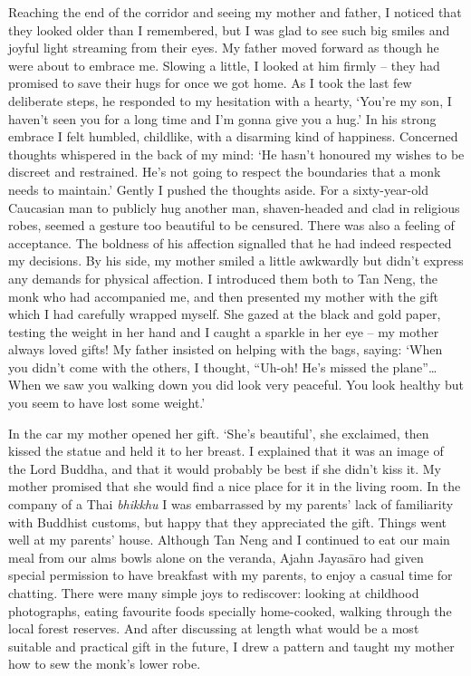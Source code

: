 Reaching the end of the corridor and seeing my mother and father, I
noticed that they looked older than I remembered, but I was glad to see
such big smiles and joyful light streaming from their eyes. My father
moved forward as though he were about to embrace me. Slowing a little, I
looked at him firmly -- they had promised to save their hugs for once
we got home. As I took the last few deliberate steps, he responded to my
hesitation with a hearty, `You're my son, I haven't seen you for a long
time and I'm gonna give you a hug.' In his strong embrace I felt
humbled, childlike, with a disarming kind of happiness. Concerned
thoughts whispered in the back of my mind: `He hasn't honoured my wishes
to be discreet and restrained. He's not going to respect the boundaries
that a monk needs to maintain.' Gently I pushed the thoughts aside. For
a sixty-year-old Caucasian man to publicly hug another man, 
shaven-headed and clad in religious robes, seemed a gesture too
beautiful to be censured. There was also a feeling of acceptance. The
boldness of his affection signalled that he had indeed respected my
decisions. By his side, my mother smiled a little awkwardly but didn't
express any demands for physical affection. I introduced them both to
Tan Neng, the monk who had accompanied me, and then presented my mother
with the gift which I had carefully wrapped myself. She gazed at the
black and gold paper, testing the weight in her hand and I caught a
sparkle in her eye -- my mother always loved gifts! My father insisted
on helping with the bags, saying: `When you didn't come with the others, 
I thought, ``Uh-oh! He's missed the plane''\ldots{} When we saw you
walking down you did look very peaceful. You look healthy but you seem
to have lost some weight.'

In the car my mother opened her gift. `She's beautiful', she exclaimed, 
then kissed the statue and held it to her breast. I explained that it
was an image of the Lord Buddha, and that it would probably be best if
she didn't kiss it. My mother promised that she would find a nice place
for it in the living room. In the company of a Thai \emph{bhikkhu} I was
embarrassed by my parents' lack of familiarity with Buddhist customs, 
but happy that they appreciated the gift. Things went well at my
parents' house. Although Tan Neng and I continued to eat our main meal
from our alms bowls alone on the veranda, Ajahn Jayasāro had given
special permission to have breakfast with my parents, to enjoy a casual
time for chatting. There were many simple joys to rediscover: looking at
childhood photographs, eating favourite foods specially home-cooked, 
walking through the local forest reserves. And after discussing at
length what would be a most suitable and practical gift in the future, I
drew a pattern and taught my mother how to sew the monk's lower robe. 

